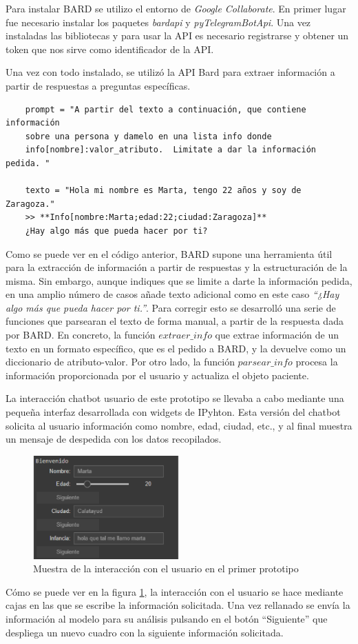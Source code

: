 Para instalar BARD se utilizo el entorno de \textit{Google Collaborate}. En primer lugar fue necesario instalar los paquetes \textit{bardapi} y \textit{pyTelegramBotApi}. Una vez instaladas las bibliotecas y para usar la API es necesario registrarse y obtener un token que nos sirve como identificador de la API. 

Una vez con todo instalado, se utilizó la API Bard para extraer información a partir de respuestas a preguntas específicas. 


\begin{verbatim}
	prompt = "A partir del texto a continuación, que contiene información
	sobre una persona y damelo en una lista info donde
	info[nombre]:valor_atributo.  Limitate a dar la información pedida. "
	
	texto = "Hola mi nombre es Marta, tengo 22 años y soy de Zaragoza."
	>> **Info[nombre:Marta;edad:22;ciudad:Zaragoza]** 
	¿Hay algo más que pueda hacer por ti?
\end{verbatim}

Como se puede ver en el código anterior, BARD supone una herramienta útil para la extracción de información a partir de respuestas y la estructuración de la misma. Sin embargo, aunque indiques que se limite a darte la información pedida, en una amplio número de casos añade texto adicional como en este caso \textit{``¿Hay algo más que pueda hacer por ti.''}. Para corregir esto se desarrolló una serie de funciones que parsearan el texto de forma manual, a partir de la respuesta dada por BARD. En concreto, la función $extraer\_info$ que extrae información de un texto en un formato específico, que es el pedido a BARD, y la devuelve como un diccionario de atributo-valor. Por otro lado, la función $parsear\_info$ procesa la información proporcionada por el usuario y actualiza el objeto paciente. 

La interacción chatbot usuario de este prototipo se llevaba a cabo mediante una pequeña interfaz desarrollada con widgets de IPyhton. 
Esta versión del chatbot solicita al usuario información como nombre, edad, ciudad, etc., y al final muestra un mensaje de despedida con los datos recopilados.
\begin{figure}[h]
	\centering
	\includegraphics[width=0.5\textwidth]{Imagenes/Iwidget}
	\caption{Muestra de la interacción  con el usuario en el primer prototipo}
	\label{fig:interfazPrototipo1}
\end{figure}
Cómo se puede ver en la figura \ref{fig:interfazPrototipo1}, la interacción con el usuario se hace mediante cajas en las que se escribe la información solicitada. Una vez rellanado se envía la información al modelo para su análisis pulsando en el botón ``Siguiente'' que despliega un nuevo cuadro con la siguiente información solicitada. 

